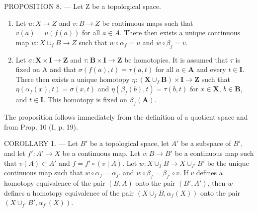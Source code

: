 PROPOSITION 8. --- Let Z be a topological space.

\begin{enumerate}
\def\labelenumi{\alph{enumi})}
\item
  Let \(u \colon X \to Z\) and \(v \colon B \to Z\) be continuous maps such that \(v(a) = u(f(a))\) for all \(a \in A\). There then exists a unique continuous map \(w \colon X \cup_f B \to Z\) such that \(w \circ \alpha_f = u\) and \(w \circ \beta_f = v\).
\item
  Let \(\sigma\colon\mathbf{X}\times\mathbf{I}\to\mathbf{Z}\) and \(\tau\colon\mathbf{B}\times\mathbf{I}\to\mathbf{Z}\) be homotopies. It is assumed that \(\tau\) is fixed on A and that \(\sigma(f(a),t)=\tau(a,t)\) for all \(a\in\mathbf{A}\) and every \(t\in\mathbf{I}\). There then exists a unique homotopy \(\eta\colon(\mathbf{X}\cup_{f}\mathbf{B})\times\mathbf{I}\to\mathbf{Z}\) such that \(\eta(\alpha_{f}(x),t)=\sigma(x,t)\) and \(\eta(\beta_{f}(b),t)=\tau(b,t)\) for \(x\in\mathbf{X}\), \(b\in\mathbf{B}\), and \(t\in\mathbf{I}\). This homotopy is fixed on \(\beta_{f}(\mathbf{A})\).
\end{enumerate}

The proposition follows immediately from the definition of a quotient space and from Prop. 10 (I, p. 19).

COROLLARY 1. --- Let \(B'\) be a topological space, let \(A'\) be a subspace of \(B'\), and let \(f': A' \to X\) be a continuous map. Let \(v: B \to B'\) be a continuous map such that \(v(A) \subset A'\) and \(f = f' \circ (v \mid A)\). Let \(w: X \cup_f B \to X \cup_{f'} B'\) be the unique continuous map such that \(w \circ \alpha_f = \alpha_{f'}\) and \(w \circ \beta_f = \beta_{f'} \circ v\). If \(v\) defines a homotopy equivalence of the pair \((B, A)\) onto the pair \((B', A')\), then \(w\) defines a homotopy equivalence of the pair \((X \cup_f B, \alpha_f(X))\) onto the pair \((X \cup_{f'} B', \alpha_{f'}(X))\).

